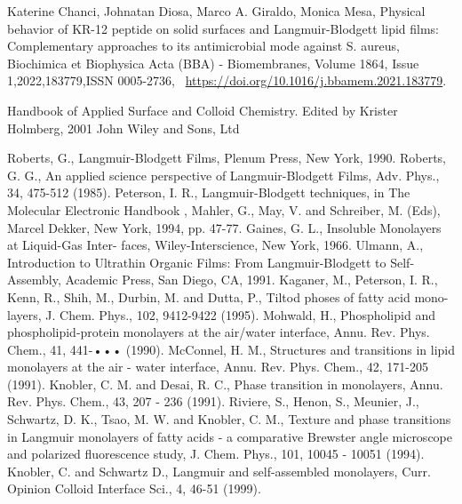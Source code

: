 \documentclass[11pt]{article}
\begin{document}
\begin{thebibliography}{3}    
	Katerine Chanci, Johnatan Diosa, Marco A. Giraldo, Monica Mesa,
Physical behavior of KR-12 peptide on solid surfaces and Langmuir-Blodgett lipid films: Complementary approaches to its antimicrobial mode against S. aureus, Biochimica et Biophysica Acta (BBA) - Biomembranes, Volume 1864, Issue 1,2022,183779,ISSN 0005-2736, ~\url{https://doi.org/10.1016/j.bbamem.2021.183779}.
    
 Handbook of Applied Surface and Colloid Chemistry. Edited by Krister Holmberg, 2001 John Wiley and Sons, Ltd
    
	Roberts, G., Langmuir-Blodgett Films, Plenum Press, New York, 1990.
	Roberts, G. G., An applied science perspective of Langmuir-Blodgett Films, Adv. Phys., 34, 475-512 (1985).
	Peterson, I. R., Langmuir-Blodgett techniques, in The Molecular Electronic Handbook , Mahler, G., May, V. and Schreiber, M. (Eds), Marcel Dekker, New York, 1994, pp. 47-77.
	Gaines, G. L., Insoluble Monolayers at Liquid-Gas Inter- faces, Wiley-Interscience, New York, 1966.
	Ulmann, A., Introduction to Ultrathin Organic Films: From Langmuir-Blodgett to Self-Assembly, Academic Press, San Diego, CA, 1991.
	Kaganer, M., Peterson, I. R., Kenn, R., Shih, M., Durbin, M. and Dutta, P., Tiltod phoses of fatty acid mono- layers, J. Chem. Phys., 102, 9412-9422 (1995).
	Mohwald, H., Phospholipid and phospholipid-protein monolayers at the air/water interface, Annu. Rev. Phys. Chem., 41, 441-••• (1990).
	McConnel, H. M., Structures and transitions in lipid monolayers at the air - water interface, Annu. Rev. Phys. Chem., 42, 171-205 (1991).
	Knobler, C. M. and Desai, R. C., Phase transition in monolayers, Annu. Rev. Phys. Chem., 43, 207 - 236 (1991).
	Riviere, S., Henon, S., Meunier, J., Schwartz, D. K., Tsao, M. W. and Knobler, C. M., Texture and phase transitions in Langmuir monolayers of fatty acids - a comparative Brewster angle microscope and polarized fluorescence study, J. Chem. Phys., 101, 10045 - 10051 (1994).
	Knobler, C. and Schwartz D., Langmuir and self-assembled monolayers, Curr. Opinion Colloid Interface Sci., 4, 46-51 (1999).

\end{thebibliography}    
    
\end{document}

